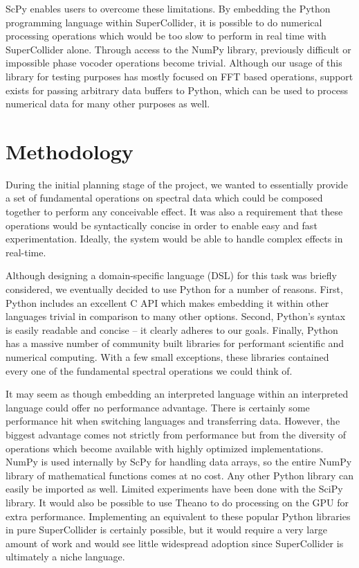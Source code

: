 \documentclass{article}
\begin{document}
ScPy enables users to overcome these limitations. By embedding the Python programming language
within SuperCollider, it is possible to do numerical processing operations which would be too slow
to perform in real time with SuperCollider alone. Through access to the NumPy library, previously
difficult or impossible phase vocoder operations become trivial. Although our usage of this library
for testing purposes has mostly focused on FFT based operations, support exists for passing
arbitrary data buffers to Python, which can be used to process numerical data for many other
purposes as well.

\section{Methodology}

During the initial planning stage of the project, we wanted to essentially provide a set of
fundamental operations on spectral data which could be composed together to perform any conceivable
effect. It was also a requirement that these operations would be syntactically concise in order to
enable easy and fast experimentation. Ideally, the system would be able to handle complex effects
in real-time.

Although designing a domain-specific language (DSL) for this task was briefly considered, we
eventually decided to use Python for a number of reasons. First, Python includes an excellent C API
which makes embedding it within other languages trivial in comparison to many other options.
Second, Python's syntax is easily readable and concise -- it clearly adheres to our goals. Finally,
Python has a massive number of community built libraries for performant scientific and numerical
computing. With a few small exceptions, these libraries contained every one of the fundamental
spectral operations we could think of.

It may seem as though embedding an interpreted language within an interpreted language could offer
no performance advantage. There is certainly some performance hit when switching languages and
transferring data. However, the biggest advantage comes not strictly from performance but from the
diversity of operations which become available with highly optimized implementations. NumPy is used
internally by ScPy for handling data arrays, so the entire NumPy library of mathematical functions
comes at no cost.  Any other Python library can easily be imported as well. Limited experiments
have been done with the SciPy library. It would also be possible to use Theano to do processing on
the GPU for extra performance. Implementing an equivalent to these popular Python libraries in pure
SuperCollider is certainly possible, but it would require a very large amount of work and would see
little widespread adoption since SuperCollider is ultimately a niche language.
\end{document}
